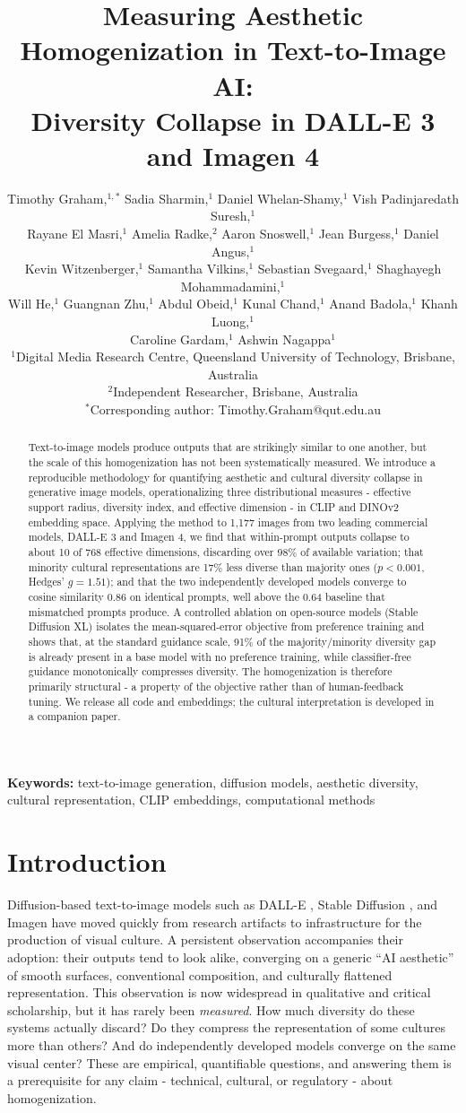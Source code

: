 \documentclass[11pt]{article}
\title{Measuring Aesthetic Homogenization in Text-to-Image AI:\\ Diversity Collapse in DALL-E 3 and Imagen 4}
\author{%
Timothy Graham,$^{1,*}$ Sadia Sharmin,$^{1}$ Daniel Whelan-Shamy,$^{1}$ Vish Padinjaredath Suresh,$^{1}$\\
Rayane El Masri,$^{1}$ Amelia Radke,$^{2}$ Aaron Snoswell,$^{1}$ Jean Burgess,$^{1}$ Daniel Angus,$^{1}$\\
Kevin Witzenberger,$^{1}$ Samantha Vilkins,$^{1}$ Sebastian Svegaard,$^{1}$ Shaghayegh Mohammadamini,$^{1}$\\
Will He,$^{1}$ Guangnan Zhu,$^{1}$ Abdul Obeid,$^{1}$ Kunal Chand,$^{1}$ Anand Badola,$^{1}$ Khanh Luong,$^{1}$\\
Caroline Gardam,$^{1}$ Ashwin Nagappa$^{1}$\\[6pt]
\small $^{1}$Digital Media Research Centre, Queensland University of Technology, Brisbane, Australia\\
\small $^{2}$Independent Researcher, Brisbane, Australia\\
\small $^{*}$Corresponding author: Timothy.Graham@qut.edu.au}
\date{}
\begin{document}
\maketitle

\begin{abstract}
Text-to-image models produce outputs that are strikingly similar to one another, but the scale of this homogenization has not been systematically measured. We introduce a reproducible methodology for quantifying aesthetic and cultural diversity collapse in generative image models, operationalizing three distributional measures - effective support radius, diversity index, and effective dimension - in CLIP and DINOv2 embedding space. Applying the method to 1,177 images from two leading commercial models, DALL-E 3 and Imagen 4, we find that within-prompt outputs collapse to about 10 of 768 effective dimensions, discarding over 98\% of available variation; that minority cultural representations are 17\% less diverse than majority ones ($p < 0.001$, Hedges' $g = 1.51$); and that the two independently developed models converge to cosine similarity 0.86 on identical prompts, well above the 0.64 baseline that mismatched prompts produce. A controlled ablation on open-source models (Stable Diffusion XL) isolates the mean-squared-error objective from preference training and shows that, at the standard guidance scale, 91\% of the majority/minority diversity gap is already present in a base model with no preference training, while classifier-free guidance monotonically compresses diversity. The homogenization is therefore primarily structural - a property of the objective rather than of human-feedback tuning. We release all code and embeddings; the cultural interpretation is developed in a companion paper.
\end{abstract}

\noindent\textbf{Keywords:} text-to-image generation, diffusion models, aesthetic diversity, cultural representation, CLIP embeddings, computational methods

\section{Introduction}

Diffusion-based text-to-image models such as DALL-E \citep{Ramesh2021}, Stable Diffusion \citep{Rombach2022}, and Imagen have moved quickly from research artifacts to infrastructure for the production of visual culture. A persistent observation accompanies their adoption: their outputs tend to look alike, converging on a generic ``AI aesthetic'' of smooth surfaces, conventional composition, and culturally flattened representation. This observation is now widespread in qualitative and critical scholarship, but it has rarely been \emph{measured}. How much diversity do these systems actually discard? Do they compress the representation of some cultures more than others? And do independently developed models converge on the same visual center? These are empirical, quantifiable questions, and answering them is a prerequisite for any claim - technical, cultural, or regulatory - about homogenization.
\end{document}
